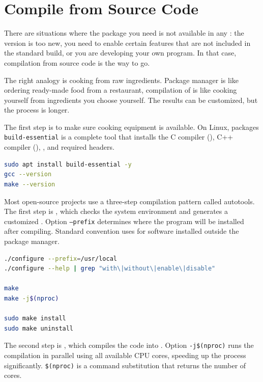 \section{Compile from Source Code}
\label{sec:compile-from-source}

There are situations where the package you need is not available in any : the version is too new, you need to enable certain features that are not included in the standard build, or you are developing your own program. In that case, compilation from source code is the way to go.

The right analogy is cooking from raw ingredients. Package manager is like ordering ready-made food from a restaurant, compilation of  is like cooking yourself from ingredients you choose yourself. The results can be customized, but the process is longer.

The first step is to make sure cooking equipment is available. On Linux, packages
\texttt{build-essential} is a complete tool that installs the C compiler
(), C++ compiler (), , and required headers.

\begin{lstlisting}[language=bash, caption={Installing build tools}]
sudo apt install build-essential -y
gcc --version
make --version
\end{lstlisting}

Most open-source projects use a three-step compilation pattern called autotools. The first step is , which checks the system environment and generates a customized . Option
\texttt{--prefix} determines where the program will be installed after compiling.
Standard convention uses  for software installed outside the package manager.

\begin{lstlisting}[language=bash, caption={Autotools compilation pattern}]
./configure --prefix=/usr/local
./configure --help | grep "with\|without\|enable\|disable"

make
make -j$(nproc)

sudo make install
sudo make uninstall
\end{lstlisting}

The second step is , which compiles the code into . Option
\texttt{-j\$(nproc)} runs the compilation in parallel using all
available CPU cores, speeding up the process significantly. \texttt{\$(nproc)} is a command substitution that returns the number of cores.

